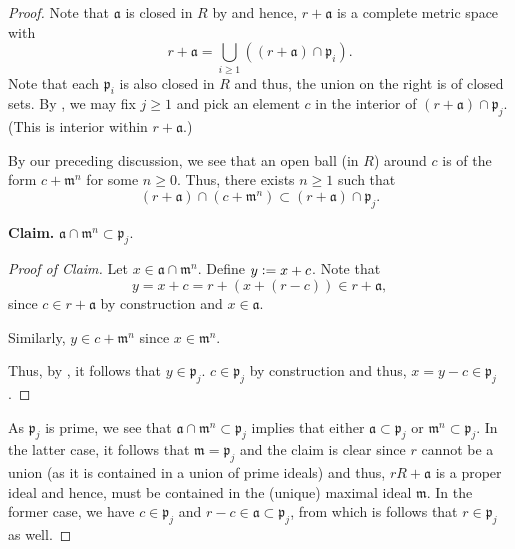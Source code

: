 \begin{proof} 
	Note that $\mathfrak{a}$ is closed in $R$ by  and hence, $r + \mathfrak{a}$ is a complete metric space with
	\begin{equation*} 
		r + \mathfrak{a} = \bigcup_{i \ge 1} ((r + \mathfrak{a}) \cap \mathfrak{p}_{i}).
	\end{equation*}
	Note that each $\mathfrak{p}_{i}$ is also closed in $R$ and thus, the union on the right is of closed sets. By , we may fix $j \ge 1$ and pick an element $c$ in the interior of $(r + \mathfrak{a}) \cap \mathfrak{p}_{j}$. (This is interior within $r + \mathfrak{a}$.)

	By our preceding discussion, we see that an open ball (in $R$) around $c$ is of the form $c + \mathfrak{m}^{n}$ for some $n \ge 0$. Thus, there exists $n \ge 1$ such that 
	\begin{equation} \label{eq:10}
		(r + \mathfrak{a}) \cap (c + \mathfrak{m}^{n}) \subset (r + \mathfrak{a}) \cap \mathfrak{p}_{j}.
	\end{equation}

	\textbf{Claim.} $\mathfrak{a} \cap \mathfrak{m}^{n} \subset \mathfrak{p}_{j}$.
	\begin{proof}[Proof of Claim] 
		Let $x \in \mathfrak{a} \cap \mathfrak{m}^{n}$. Define $y \vcentcolon= x + c$. \newline
		Note that
		\begin{equation*} 
			y = x + c = r + (x + (r - c)) \in r + \mathfrak{a},
		\end{equation*}
		since $c \in r + \mathfrak{a}$ by construction and $x \in \mathfrak{a}$.

		Similarly, $y \in c + \mathfrak{m}^{n}$ since $x \in \mathfrak{m}^{n}$.

		Thus, by , it follows that $y \in \mathfrak{p}_{j}$. $c \in \mathfrak{p}_{j}$ by construction and thus, $x = y - c \in \mathfrak{p}_{j}$.
	\end{proof}

	As $\mathfrak{p}_{j}$ is prime, we see that $\mathfrak{a} \cap \mathfrak{m}^{n} \subset \mathfrak{p}_{j}$ implies that either $\mathfrak{a} \subset \mathfrak{p}_{j}$ or $\mathfrak{m}^{n} \subset \mathfrak{p}_{j}$. \newline
	In the latter case, it follows that $\mathfrak{m} = \mathfrak{p}_{j}$ and the claim is clear since $r$ cannot be a union (as it is contained in a union of prime ideals) and thus, $rR + \mathfrak{a}$ is a proper ideal and hence, must be contained in the (unique) maximal ideal $\mathfrak{m}$. \newline
	In the former case, we have $c \in \mathfrak{p}_{j}$ and $r - c \in \mathfrak{a} \subset \mathfrak{p}_{j}$, from which is follows that $r \in \mathfrak{p}_{j}$ as well.
\end{proof}

